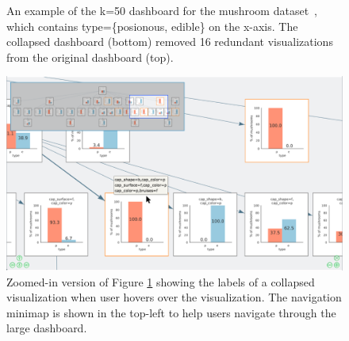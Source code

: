 {\begin{figure}[ht!]
  \caption{An example of the k=50 dashboard for the mushroom dataset~\cite{mushroom}, which contains type=\{posionous, edible\} on the x-axis. The collapsed dashboard (bottom) removed 16 redundant visualizations from the original dashboard (top).}
  \label{fig:collapse_demo}
  \end{figure}
  \begin{figure}[ht!]
  \centering
  \includegraphics[width=\linewidth]{figures/minimap_zoom.png}
  \caption{Zoomed-in version of Figure \ref{fig:collapse_demo} showing the labels of a collapsed visualization when user hovers over the visualization. The navigation minimap is shown in the top-left to help users navigate through the large dashboard.}
  \label{fig:hover_minimap}
  \end{figure}
}

\fi
